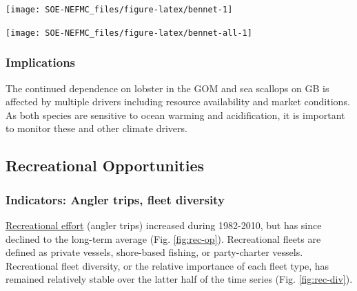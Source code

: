 \documentclass[
  10pt,
]{article}
\let\origfigure\figure
\let\endorigfigure\endfigure
\renewenvironment{figure}[1][2] {
    \expandafter\origfigure\expandafter[H]
} {
    \endorigfigure
}
\begin{document}
\begin{figure}

{\centering \texttt{[image: SOE-NEFMC\_files/figure-latex/bennet-1]} 

}

\caption{Revenue change from the 1982 baseline in 2022 dollars (black), price, and volume for commercial landings from Georges Bank (GB: left) and the Gulf of Maine (GOM: right)}\label{fig:bennet}
\end{figure}
\begin{figure}

{\centering \texttt{[image: SOE-NEFMC\_files/figure-latex/bennet-all-1]} 

}

\caption{Revenue change from the long-term mean in 2022 dollars (black), price, and volume for commercial landings from Georges Bank (GB: top panels) and the Gulf of Maine (GOM: bottom panels)}\label{fig:bennet-all}
\end{figure}

\hypertarget{implications-1}{%
\subsubsection{Implications}\label{implications-1}}

The continued dependence on lobster in the GOM and sea scallops on GB is affected by multiple drivers including resource availability and market conditions. As both species are sensitive to ocean warming and acidification, it is important to monitor these and other climate drivers.

\hypertarget{recreational-opportunities}{%
\subsection{Recreational Opportunities}\label{recreational-opportunities}}

\hypertarget{indicators-angler-trips-fleet-diversity}{%
\subsubsection{Indicators: Angler trips, fleet diversity}\label{indicators-angler-trips-fleet-diversity}}

\href{https://noaa-edab.github.io/catalog/recdat.html}{Recreational effort} (angler trips) increased during 1982-2010, but has since declined to the long-term average (Fig. \ref{fig:rec-op}). Recreational fleets are defined as private vessels, shore-based fishing, or party-charter vessels. Recreational fleet diversity, or the relative importance of each fleet type, has remained relatively stable over the latter half of the time series (Fig. \ref{fig:rec-div}).
\end{document}
